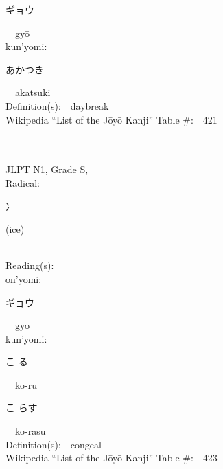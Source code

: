 \begin{multicols}{2}
{\hspace*{2em}}{\begin{CJK}{UTF8}{min} ギョウ \end{CJK}}\ \ gy\=o\ \ \\
{\hspace*{1em}}kun'yomi:\ \ \\
{\hspace*{2em}}{\begin{CJK}{UTF8}{min} あかつき \end{CJK}}\ \ akatsuki\ \ \\
Definition(s):\ \ daybreak \\
Wikipedia ``List of the J\=oy\=o Kanji'' Table \#:\ \ 421 \\
\ \ \\
{\fontsize{34pt}{40pt}  }\ \ \\
{JLPT N1, Grade S, \\Radical:\ \ {\begin{CJK}{UTF8}{min} 冫 \end{CJK}} (ice) } \\
Reading(s):\ \ \\
{\hspace*{1em}}on'yomi:\ \ \\
{\hspace*{2em}}{\begin{CJK}{UTF8}{min} ギョウ \end{CJK}}\ \ gy\=o\ \ \\
{\hspace*{1em}}kun'yomi:\ \ \\
{\hspace*{2em}}{\begin{CJK}{UTF8}{min} こ-る \end{CJK}}\ \ ko-ru\ \ \\
{\hspace*{2em}}{\begin{CJK}{UTF8}{min} こ-らす \end{CJK}}\ \ ko-rasu\ \ \\
Definition(s):\ \ congeal \\
Wikipedia ``List of the J\=oy\=o Kanji'' Table \#:\ \ 423 \\
\ \ \\
{\fontsize{34pt}{40pt}  }\ \ \\

\end{multicols}
